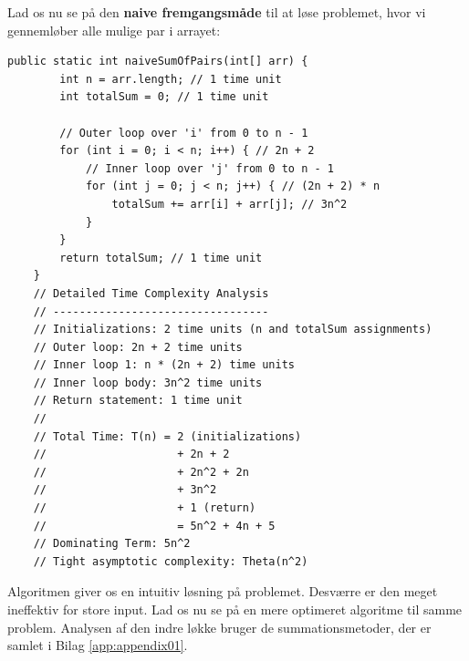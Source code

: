 Lad os nu se på den \textbf{naive fremgangsmåde} til at løse problemet, hvor vi gennemløber alle mulige par i arrayet:

\begin{lstlisting}[style = javaStyle, caption={Naiv sum af par med analyse}, label={lst:java_naive_sum_pairs_analysis}]
    public static int naiveSumOfPairs(int[] arr) {
        int n = arr.length; // 1 time unit
        int totalSum = 0; // 1 time unit

        // Outer loop over 'i' from 0 to n - 1
        for (int i = 0; i < n; i++) { // 2n + 2
            // Inner loop over 'j' from 0 to n - 1
            for (int j = 0; j < n; j++) { // (2n + 2) * n
                totalSum += arr[i] + arr[j]; // 3n^2
            }
        }
        return totalSum; // 1 time unit
    }
    // Detailed Time Complexity Analysis
    // ---------------------------------
    // Initializations: 2 time units (n and totalSum assignments)
    // Outer loop: 2n + 2 time units
    // Inner loop 1: n * (2n + 2) time units
    // Inner loop body: 3n^2 time units
    // Return statement: 1 time unit
    //
    // Total Time: T(n) = 2 (initializations)
    //                    + 2n + 2
    //                    + 2n^2 + 2n
    //                    + 3n^2
    //                    + 1 (return)
    //                    = 5n^2 + 4n + 5
    // Dominating Term: 5n^2
    // Tight asymptotic complexity: Theta(n^2)
\end{lstlisting}

Algoritmen giver os en intuitiv løsning på problemet. Desværre er den meget ineffektiv for store input. Lad os nu se på en mere optimeret algoritme til samme problem. Analysen af den indre løkke bruger de summationsmetoder, der er samlet i Bilag \ref{app:appendix01}.

